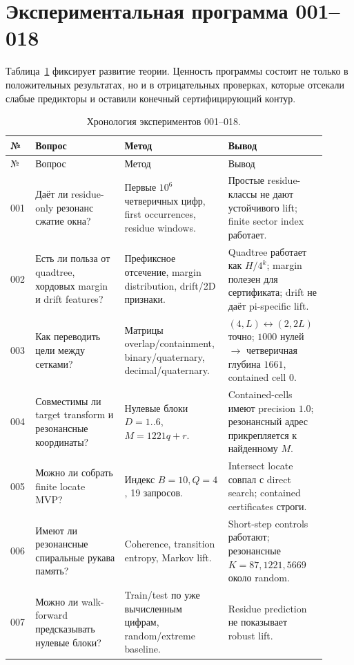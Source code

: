 \documentclass[11pt,a4paper]{article}
\begin{document}
\section{Экспериментальная программа 001--018}

Таблица~\ref{tab:experiments} фиксирует развитие теории.  Ценность программы состоит не только в положительных результатах, но и в отрицательных проверках, которые отсекали слабые предикторы и оставили конечный сертифицирующий контур.

\scriptsize
\begin{longtable}{p{0.06\linewidth}p{0.27\linewidth}p{0.29\linewidth}p{0.29\linewidth}}
\caption{Хронология экспериментов 001--018.}\label{tab:experiments}\\
\toprule
№ & Вопрос & Метод & Вывод \\
\midrule
\endfirsthead
\toprule
№ & Вопрос & Метод & Вывод \\
\midrule
\endhead
001 & Даёт ли residue-only резонанс сжатие окна? & Первые $10^6$ четверичных цифр, first occurrences, residue windows. & Простые residue-классы не дают устойчивого lift; finite sector index работает. \\
002 & Есть ли польза от quadtree, хордовых margin и drift features? & Префиксное отсечение, margin distribution, drift/2D признаки. & Quadtree работает как $H/4^k$; margin полезен для сертификата; drift не даёт pi-specific lift. \\
003 & Как переводить цели между сетками? & Матрицы overlap/containment, binary/quaternary, decimal/quaternary. & $(4,L)\leftrightarrow(2,2L)$ точно; $1000$ нулей $\to$ четверичная глубина $1661$, contained cell $0$. \\
004 & Совместимы ли target transform и резонансные координаты? & Нулевые блоки $D=1..6$, $M=1221q+r$. & Contained-cells имеют precision $1.0$; резонансный адрес прикрепляется к найденному $M$. \\
005 & Можно ли собрать finite locate MVP? & Индекс $B=10,Q=4$, 19 запросов. & Intersect locate совпал с direct search; contained certificates строги. \\
006 & Имеют ли резонансные спиральные рукава память? & Coherence, transition entropy, Markov lift. & Short-step controls работают; резонансные $K=87,1221,5669$ около random. \\
007 & Можно ли walk-forward предсказывать нулевые блоки? & Train/test по уже вычисленным цифрам, random/extreme baseline. & Residue prediction не показывает robust lift. \\

\end{longtable}
\end{document}
